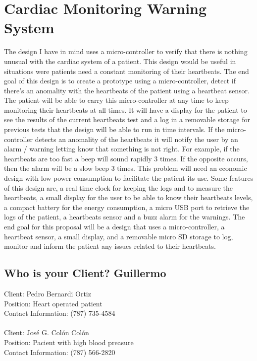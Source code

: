 \chapter{Cardiac Monitoring Warning System}

The design I have in mind uses a micro-controller to verify that there is nothing unusual with the cardiac system of a patient. This design would be useful in situations were patients need a constant monitoring of their heartbeats. The end goal of this design is to create a prototype using a micro-controller, detect if there's an anomality with the heartbeats of the patient using a heartbeat sensor. The patient will be able to carry this micro-controller at any time to keep monitoring their heartbeats at all times. It will have a display for the patient to see the results of the current heartbeats test and a log in a removable storage for previous tests that the design will be able to run in time intervals. If the micro-controller detects an anomality of the heartbeats it will notify the user by an alarm / warning letting know that something is not right. For example, if the heartbeats are too fast a beep will sound rapidly 3 times. If the opposite occurs, then the alarm will be a slow beep 3 times. This problem will need an economic design with low power consumption to facilitate the patient its use. Some features of this design are, a real time clock for keeping the logs and to measure the heartbeats, a small display for the user to be able to know their heartbeats levels, a compact battery for the energy consumption, a micro USB port to retrieve the logs of the patient, a heartbeats sensor and a buzz alarm for the warnings. The end goal for this proposal will be a design that uses a micro-controller, a heartbeat sensor, a small display, and a removable micro SD storage to log, monitor and inform the patient any issues related to their heartbeats.


\section{Who is your Client? Guillermo}
Client: Pedro Bernardi Ortiz\\
Position: Heart operated patient\\
Contact Information: (787) 735-4584\\
\\
Client: José G. Colón Colón\\
Position: Pacient with high blood preasure\\
Contact Information: (787) 566-2820\\